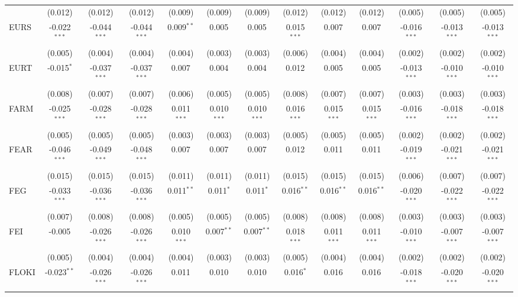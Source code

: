 \begin{table}[!htbp]
\begin{tabular}{@{\extracolsep{5pt}}lcccccccccccc}
  & (0.012) & (0.012) & (0.012) & (0.009) & (0.009) & (0.009) & (0.012) & (0.012) & (0.012) & (0.005) & (0.005) & (0.005) \\
 EURS & -0.022$^{***}$ & -0.044$^{***}$ & -0.044$^{***}$ & 0.009$^{**}$ & 0.005$^{}$ & 0.005$^{}$ & 0.015$^{***}$ & 0.007$^{}$ & 0.007$^{}$ & -0.016$^{***}$ & -0.013$^{***}$ & -0.013$^{***}$ \\
  & (0.005) & (0.004) & (0.004) & (0.004) & (0.003) & (0.003) & (0.006) & (0.004) & (0.004) & (0.002) & (0.002) & (0.002) \\
 EURT & -0.015$^{*}$ & -0.037$^{***}$ & -0.037$^{***}$ & 0.007$^{}$ & 0.004$^{}$ & 0.004$^{}$ & 0.012$^{}$ & 0.005$^{}$ & 0.005$^{}$ & -0.013$^{***}$ & -0.010$^{***}$ & -0.010$^{***}$ \\
  & (0.008) & (0.007) & (0.007) & (0.006) & (0.005) & (0.005) & (0.008) & (0.007) & (0.007) & (0.003) & (0.003) & (0.003) \\
 FARM & -0.025$^{***}$ & -0.028$^{***}$ & -0.028$^{***}$ & 0.011$^{***}$ & 0.010$^{***}$ & 0.010$^{***}$ & 0.016$^{***}$ & 0.015$^{***}$ & 0.015$^{***}$ & -0.016$^{***}$ & -0.018$^{***}$ & -0.018$^{***}$ \\
  & (0.005) & (0.005) & (0.005) & (0.003) & (0.003) & (0.003) & (0.005) & (0.005) & (0.005) & (0.002) & (0.002) & (0.002) \\
 FEAR & -0.046$^{***}$ & -0.049$^{***}$ & -0.048$^{***}$ & 0.007$^{}$ & 0.007$^{}$ & 0.007$^{}$ & 0.012$^{}$ & 0.011$^{}$ & 0.011$^{}$ & -0.019$^{***}$ & -0.021$^{***}$ & -0.021$^{***}$ \\
  & (0.015) & (0.015) & (0.015) & (0.011) & (0.011) & (0.011) & (0.015) & (0.015) & (0.015) & (0.006) & (0.007) & (0.007) \\
 FEG & -0.033$^{***}$ & -0.036$^{***}$ & -0.036$^{***}$ & 0.011$^{**}$ & 0.011$^{*}$ & 0.011$^{*}$ & 0.016$^{**}$ & 0.016$^{**}$ & 0.016$^{**}$ & -0.020$^{***}$ & -0.022$^{***}$ & -0.022$^{***}$ \\
  & (0.007) & (0.008) & (0.008) & (0.005) & (0.005) & (0.005) & (0.008) & (0.008) & (0.008) & (0.003) & (0.003) & (0.003) \\
 FEI & -0.005$^{}$ & -0.026$^{***}$ & -0.026$^{***}$ & 0.010$^{***}$ & 0.007$^{**}$ & 0.007$^{**}$ & 0.018$^{***}$ & 0.011$^{***}$ & 0.011$^{***}$ & -0.010$^{***}$ & -0.007$^{***}$ & -0.007$^{***}$ \\
  & (0.005) & (0.004) & (0.004) & (0.004) & (0.003) & (0.003) & (0.005) & (0.004) & (0.004) & (0.002) & (0.002) & (0.002) \\
 FLOKI & -0.023$^{**}$ & -0.026$^{***}$ & -0.026$^{***}$ & 0.011$^{}$ & 0.010$^{}$ & 0.010$^{}$ & 0.016$^{*}$ & 0.016$^{}$ & 0.016$^{}$ & -0.018$^{***}$ & -0.020$^{***}$ & -0.020$^{***}$ \\

\end{tabular}
\end{table}
